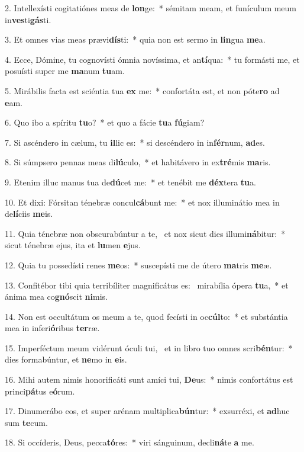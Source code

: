 2. Intellexísti cogitatiónes meas de \textbf{lon}ge:~*  sémitam meam, et funículum meum in\textbf{ves}ti\textbf{gás}ti.\

3. Et omnes vias meas prævi\textbf{dís}ti:~*  quia non est sermo in \textbf{lin}gua \textbf{me}a.\

4. Ecce, Dómine, tu cognovísti ómnia novíssima, et an\textbf{tí}qua:~*  tu formásti me, et posuísti super me \textbf{ma}num \textbf{tu}am.\

5. Mirábilis facta est sciéntia tua \textbf{ex} me:~*  confortáta est, et non póte\textbf{ro} ad \textbf{e}am.\

6. Quo ibo a spíritu \textbf{tu}o?~*  et quo a fácie \textbf{tu}a \textbf{fú}giam?\

7. Si ascéndero in cælum, tu \textbf{il}lic es:~*  si descéndero in in\textbf{fér}num, \textbf{ad}es.\

8. Si súmpsero pennas meas di\textbf{lú}culo,~*  et habitávero in ex\textbf{tré}mis \textbf{ma}ris.\

9. Etenim illuc manus tua de\textbf{dú}cet me:~*  et tenébit me \textbf{déx}tera \textbf{tu}a.\

10. Et dixi: Fórsitan ténebræ concul\textbf{cá}bunt me:~*  et nox illuminátio mea in de\textbf{lí}ciis \textbf{me}is.\

11. Quia ténebræ non obscurabúntur a te, \dag\  et nox sicut dies illumi\textbf{ná}bitur:~*  sicut ténebræ ejus, ita et \textbf{lu}men \textbf{e}jus.\

12. Quia tu possedísti renes \textbf{me}os:~*  suscepísti me de útero \textbf{ma}tris \textbf{me}æ.\

13. Confitébor tibi quia terribíliter magnificátus es: \dag\  mirabília ópera \textbf{tu}a,~*  et ánima mea co\textbf{gnó}scit \textbf{ni}mis.\

14. Non est occultátum os meum a te, quod fecísti in oc\textbf{cúl}to:~*  et substántia mea in inferi\textbf{ó}ribus \textbf{ter}ræ.\

15. Imperféctum meum vidérunt óculi tui, \dag\  et in libro tuo omnes scri\textbf{bén}tur:~*  dies formabúntur, et \textbf{ne}mo in \textbf{e}is.\

16. Mihi autem nimis honorificáti sunt amíci tui, \textbf{De}us:~*  nimis confortátus est princi\textbf{pá}tus e\textbf{ó}rum.\

17. Dinumerábo eos, et super arénam multiplica\textbf{bún}tur:~*  exsurréxi, et \textbf{ad}huc sum \textbf{te}cum.\

18. Si occíderis, Deus, pecca\textbf{tó}res:~*  viri sánguinum, decli\textbf{ná}te \textbf{a} me.\

